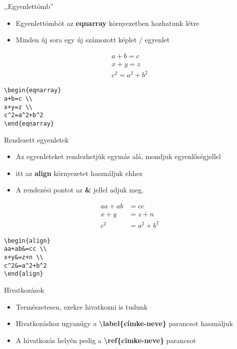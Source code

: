 \documentclass[11pt]{beamer}
\newcommand{\tbs}{\textbackslash}
\begin{document}
\begin{frame}[fragile]{,,Egyenlettömb''}
\begin{itemize}
\item Egyenlettömböt az \textbf{eqnarray} környezetben hozhatunk létre
\item Minden új sora egy új számozott képlet / egyenlet
\end{itemize}
\begin{eqnarray}
a+b=c \\
x+y=z \\
c^2=a^2+b^2
\end{eqnarray}
\begin{verbatim}
\begin{eqnarray}
a+b=c \\
x+y=z \\
c^2=a^2+b^2
\end{eqnarray}
\end{verbatim}
\end{frame}

\begin{frame}[fragile]{Rendezett egyenletek}
\begin{itemize}
\item Az egyenleteket rendezhetjük egymás alá, mondjuk egyenlőségjellel
\item itt az \textbf{align} környezetet használjuk ehhez
\item A rendezési pontot az \textbf{\&} jellel adjuk meg.
\end{itemize}

\begin{align}
aa+ab&=cc \\
x+y&=z+n \\
c^2&=a^2+b^2
\end{align}

\begin{verbatim}
\begin{align}
aa+ab&=cc \\
x+y&=z+n \\
c^2&=a^2+b^2
\end{align}
\end{verbatim}
\end{frame}

\begin{frame}{Hivatkozások}
\begin{itemize}
\item Természetesen, ezekre hivatkozni is tudunk
\item Hivatkozáshoz ugyanúgy a \textbf{\tbs label\{címke-neve\}} parancsot használjuk
\item A hivatkozás helyén pedig a \textbf{\tbs ref\{cimke-neve\}} parancsot
\end{itemize}
\end{frame}
\end{document}
